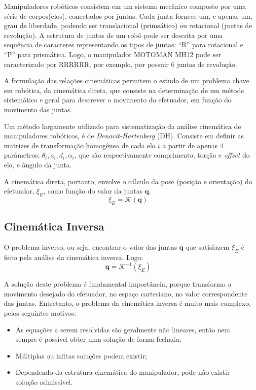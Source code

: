 Manipuladores robóticos consistem em um sistema mecânico composto por uma série
de corpos(elos), conectados por juntas. Cada junta fornece um, e apenas um, grau
de liberdade, podendo ser translacional (primsático) ou rotacional (juntas de
revolução). A estrutura de juntas de um robô pode ser descrita por uma sequência
de caracteres representando os tipos de juntas: ``R'' para rotacional e ``P''
para prismática. Logo, o manipulador MOTOMAN MH12 pode ser caracterizado por
RRRRRR, por exemplo, por possuir 6 juntas de revolução.

A formulação das relações cinemáticas permitem o estudo de um problema chave em
robótica, da cinemática direta, que consiste na determinação de um método
sistemático e geral para descrever o movimento do efetuador, em função do
movimento das juntas.

Um método largamente utilizado para sistematização da análise cinemática de
manipuladores robóticos, é de \emph{Denavit-Hartenberg} (DH).
Consiste em definir as matrizes de transformação homogênea de cada elo $i$ a
partir de apenas 4 parâmetros: $\theta_i, a_i, d_i, \alpha_i$, que são
respectivamente comprimento, torção e \textit{offset} do elo, e ângulo da junta.

A cinemática direta, portanto, envolve o cálculo da pose (posição e orientação)
do efetuador, $\xi_{E}$, como função do valor da juntas $\mathbf{q}$. 
%
\begin{equation}
	\xi_{E} = \mathcal{K}(\mathbf{q})
\end{equation}
%


\subsection{Cinemática Inversa}\label{sec::ikin}

O problema inverso, ou seja, encontrar o valor das juntas $\mathbf{q}$ que
satisfazem $\xi_{E}$ é feito pela análise da cinemática inversa. Logo:
%
\begin{equation} \label{eq::invq}
	\mathbf{q} = \mathcal{K}^{-1}(\xi_{E})
\end{equation}
%

A solução deste problema é fundamental importância, porque transforma o
movimento desejado do efetuador, no espaço cartesiano, no valor correspondente
das juntas. Entretanto, o problema da cinemática inversa é muito mais complexo,
pelos seguintes motivos:
%
\begin{itemize}
  \item As equações a serem resolvidas são geralmente não lineares, então nem
  sempre é possível obter uma solução de forma fechada;
  \item Múltiplas ou infitas soluções podem existir;
  \item Dependendo da estrutura cinemática do manipulador, pode não existir
  solução admissível.
\end{itemize}
%

